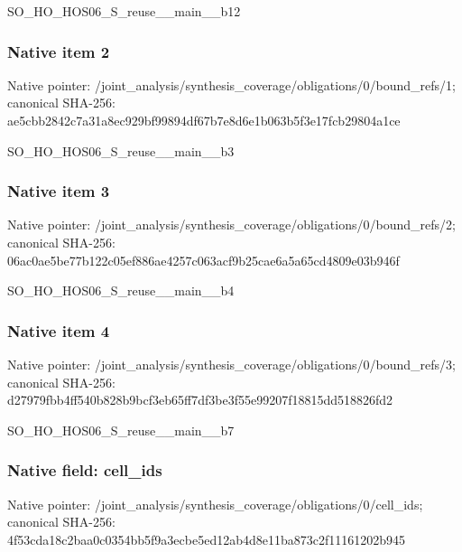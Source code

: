 \documentclass[10pt,a4paper]{article}
\begin{document}
\begingroup\raggedright\sloppy SO\_\allowbreak{}HO\_\allowbreak{}HOS06\_\allowbreak{}S\_\allowbreak{}reuse\_\allowbreak{}\_\allowbreak{}main\_\allowbreak{}\_\allowbreak{}b12\par\endgroup

\subsubsection{Native item 2}
Native pointer: /joint\_\allowbreak{}analysis/synthesis\_\allowbreak{}coverage/obligations/0/bound\_\allowbreak{}refs/1; canonical SHA-256: ae5cbb2842c7a31a8ec929bf99894df67b7e8d6e1b063b5f3e17fcb29804a1ce

\begingroup\raggedright\sloppy SO\_\allowbreak{}HO\_\allowbreak{}HOS06\_\allowbreak{}S\_\allowbreak{}reuse\_\allowbreak{}\_\allowbreak{}main\_\allowbreak{}\_\allowbreak{}b3\par\endgroup

\subsubsection{Native item 3}
Native pointer: /joint\_\allowbreak{}analysis/synthesis\_\allowbreak{}coverage/obligations/0/bound\_\allowbreak{}refs/2; canonical SHA-256: 06ac0ae5be77b122c05ef886ae4257c063acf9b25cae6a5a65cd4809e03b946f

\begingroup\raggedright\sloppy SO\_\allowbreak{}HO\_\allowbreak{}HOS06\_\allowbreak{}S\_\allowbreak{}reuse\_\allowbreak{}\_\allowbreak{}main\_\allowbreak{}\_\allowbreak{}b4\par\endgroup

\subsubsection{Native item 4}
Native pointer: /joint\_\allowbreak{}analysis/synthesis\_\allowbreak{}coverage/obligations/0/bound\_\allowbreak{}refs/3; canonical SHA-256: d27979fbb4ff540b828b9bcf3eb65ff7df3be3f55e99207f18815dd518826fd2

\begingroup\raggedright\sloppy SO\_\allowbreak{}HO\_\allowbreak{}HOS06\_\allowbreak{}S\_\allowbreak{}reuse\_\allowbreak{}\_\allowbreak{}main\_\allowbreak{}\_\allowbreak{}b7\par\endgroup

\subsubsection{Native field: cell\_\allowbreak{}ids}
Native pointer: /joint\_\allowbreak{}analysis/synthesis\_\allowbreak{}coverage/obligations/0/cell\_\allowbreak{}ids; canonical SHA-256: 4f53cda18c2baa0c0354bb5f9a3ecbe5ed12ab4d8e11ba873c2f11161202b945
\end{document}
